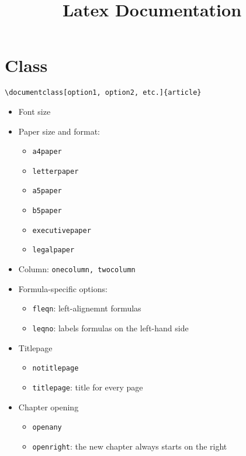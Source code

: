 \documentclass{article}
\title{Latex Documentation}
\author{}
\date{}
\begin{document}
\maketitle

\section{Class}
\begin{center}
    \verb!\documentclass[option1, option2, etc.]{article}!
\end{center}

\begin{itemize}
    \item Font size
    \item Paper size and format:
    \begin{itemize}
        \item \verb!a4paper!
        \item \verb!letterpaper!
        \item \verb!a5paper!
        \item \verb!b5paper!
        \item \verb!executivepaper!
        \item \verb!legalpaper!
    \end{itemize}
    \item Column: \verb!onecolumn, twocolumn!
    \item Formula-specific options:
    \begin{itemize}
        \item \verb!fleqn!: left-alignemnt formulas
        \item \verb!leqno!: labels formulas on the left-hand side
    \end{itemize}
    \item Titlepage
    \begin{itemize}
        \item \verb!notitlepage!
        \item \verb!titlepage!: title for every page
    \end{itemize}
    \item Chapter opening
    \begin{itemize}
        \item \verb!openany!
        \item \verb!openright!: the new chapter always starts on the right
    \end{itemize}
\end{itemize}
\end{document}
